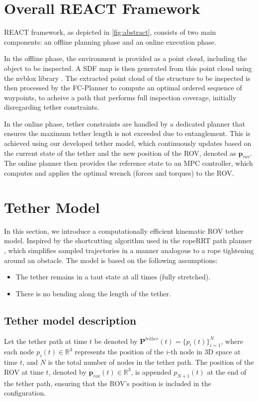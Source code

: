 \section{Overall \ac{REACT}  Framework}
\label{sec:framework}
\ac{REACT} framework, as depicted in \ref{fig:abstract}, consists of two main components: an offline planning phase and an online execution phase.

In the offline phase, the environment is provided as a point cloud, including the object to be inspected. A \ac{SDF} map is then generated from this point cloud using the nvblox library \cite{nvblox}. The extracted point cloud of the structure to be inspected is then processed by the FC-Planner \cite{feng2024fc} to compute an optimal ordered sequence of waypoints, to acheive a path that performs full inspection coverage, initially disregarding tether constraints.

In the online phase, tether constraints are handled by a dedicated planner that ensures the maximum tether length is not exceeded due to entanglement. This is achieved using our developed tether model, which continuously updates based on the current state of the tether and the new position of the \ac{ROV}, denoted as $\textbf{p}_{rov}$. The online planner then provides the reference state to an \ac{MPC} controller, which computes and applies the optimal wrench (forces and torques) to the \ac{ROV}.



\section{Tether Model}
\label{sec:tether_model}
In this section, we introduce a computationally efficient kinematic \ac{ROV} tether model. Inspired by the shortcutting algorithm used in the ropeRRT path planner \cite{roperrt}, which simplifies sampled trajectories in a manner analogous to a rope tightening around an obstacle. The model is based on the following assumptions:

\begin{itemize}  
    \item The tether remains in a taut state at all times (fully stretched).  
    \item There is no bending along the length of the tether.  
\end{itemize}  

\subsection{Tether model description}
Let the tether path at time \( t \) be denoted by \( \mathbf{P}^{tether}(t) = \{ p_i(t) \}_{i=1}^{N} \), where each node \( p_i(t) \in \mathbb{R}^3 \) represents the position of the \( i \)-th node in 3D space at time \( t \), and \( N \) is the total number of nodes in the tether path. The position of the ROV at time \( t \), denoted by \( \mathbf{p}_{rov}(t) \in \mathbb{R}^3 \), is appended \( p_{N+1}(t) \) at the end of the tether path, ensuring that the ROV's position is included in the configuration. 

